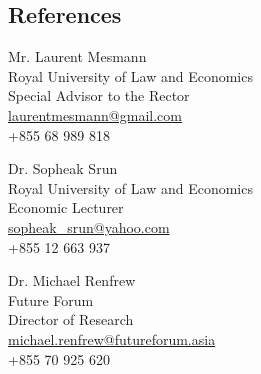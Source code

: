 \documentclass[10pt,a4paper]{article}
\begin{document}
\subsection*{References}		
\parbox{0.5\textwidth}{ %
	Mr. Laurent Mesmann \\ 
	Royal University of Law and Economics\\ 
	Special Advisor to the Rector\\
	\href{mailto: laurentmesmann@gmail.com}{laurentmesmann@gmail.com}\\
	+855 68 989 818
}
\hfill %
\parbox{0.5\textwidth}{ %
	Dr. Sopheak Srun  \\ 
	Royal University of Law and Economics \\ 
	Economic Lecturer\\
	\href{mailto: sopheak_srun@yahoo.com}{sopheak\_srun@yahoo.com}\\
	+855 12 663 937\\
}

\vspace{1.5em}
\parbox{0.5\textwidth}{ %
	Dr. Michael Renfrew\\ 
	Future Forum\\ 
	Director of Research\\
	\href{mailto: michael.renfrew@futureforum.asia}{michael.renfrew@futureforum.asia}\\
	+855 70 925 620
}
\hfill %
\parbox{0.5\textwidth}{ %
}

\end{document}
